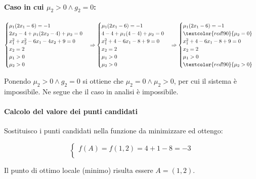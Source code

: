 \documentclass[\main/main.tex]{subfiles}
\begin{document}
\paragraph*{Caso in cui $\mu_2 > 0 \land g_2 = 0$:}
\[
	\begin{cases}
		\mu_1(2x_1 - 6)  = -1                     \\
		2x_2 -4 + \mu_1(2x_2 - 4) + \mu_2 = 0 \\
		x^2_1+x^2_2-6x_1-4x_2+9 = 0               \\
		x_2 = 2                                   \\
		\mu_1 > 0                                 \\
		\mu_2 > 0
	\end{cases}
	\Rightarrow
	\begin{cases}
		\mu_1(2x_1 - 6)  = -1            \\
		4 -4 + \mu_1(4 - 4) + \mu_2 = 0 \\
		x^2_1+4-6x_1-8+9 = 0             \\
		x_2 = 2                          \\
		\mu_1 > 0                        \\
		\mu_2 > 0
	\end{cases}
	\Rightarrow
	\begin{cases}
		\mu_1(2x_1 - 6)  = -1        \\
		\textcolor{red!90}{\mu_2 =0} \\
		x^2_1+4-6x_1-8+9 = 0         \\
		x_2 = 2                      \\
		\mu_1 > 0                    \\
		\textcolor{red!90}{\mu_2 > 0}
	\end{cases}
\]

Ponendo $\mu_2 > 0 \land g_2 = 0$ si ottiene che $\mu_2 = 0 \land \mu_2 > 0$, per cui il sistema è impossibile. Ne segue che il caso in analisi è impossibile.

\paragraph*{Calcolo del valore dei punti candidati}
Sostituisco i punti candidati nella funzione da minimizzare ed ottengo:

\[
	\begin{cases}
		f(A) = f(1,2) =  4 + 1 - 8 = -3 \\
	\end{cases}
\]

Il punto di ottimo locale (minimo) risulta essere $A = (1, 2)$.
\end{document}
